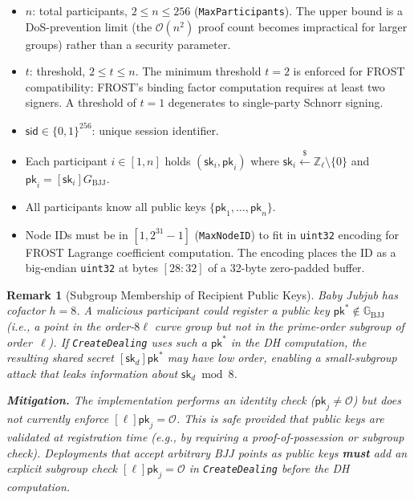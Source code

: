 \documentclass[11pt,a4paper]{article}
\newtheorem{remark}{Remark}[section]
\newcommand{\Z}{\mathbb{Z}}
\newcommand{\G}{\mathbb{G}}
\newcommand{\Gbj}{\G_{\mathrm{BJJ}}}
\newcommand{\Fl}{\Z_\ell}
\newcommand{\cofactor}{h}
\newcommand{\genbjj}{G_{\mathrm{BJJ}}}
\newcommand{\sk}{\mathsf{sk}}
\newcommand{\pk}{\mathsf{pk}}
\newcommand{\sid}{\mathsf{sid}}
\newcommand{\getsr}{\xleftarrow{\$}}
\begin{document}
\begin{itemize}[nosep]
  \item $n$: total participants, $2 \le n \le 256$ (\texttt{MaxParticipants}).
    The upper bound is a DoS-prevention limit (the $\mathcal{O}(n^2)$ proof
    count becomes impractical for larger groups) rather than a security
    parameter.
  \item $t$: threshold, $2 \le t \le n$. The minimum threshold $t = 2$ is
    enforced for FROST compatibility: FROST's binding factor computation
    requires at least two signers. A threshold of $t = 1$ degenerates to
    single-party Schnorr signing.
  \item $\sid \in \{0,1\}^{256}$: unique session identifier.
  \item Each participant $i \in [1, n]$ holds $(\sk_i, \pk_i)$ where
    $\sk_i \getsr \Fl \setminus \{0\}$ and $\pk_i = [\sk_i]\genbjj$.
  \item All participants know all public keys $\{\pk_1, \ldots, \pk_n\}$.
  \item Node IDs must be in $[1, 2^{31} - 1]$ (\texttt{MaxNodeID}) to fit in
    \texttt{uint32} encoding for FROST Lagrange coefficient computation. The
    encoding places the ID as a big-endian \texttt{uint32} at bytes $[28{:}32]$
    of a 32-byte zero-padded buffer.
\end{itemize}

\begin{remark}[Subgroup Membership of Recipient Public Keys]
  \label{rem:subgroup-check}
  Baby Jubjub has cofactor $\cofactor = 8$. A malicious participant could
  register a public key $\pk^* \notin \Gbj$ (i.e., a point in the order-$8\ell$
  curve group but not in the prime-order subgroup of order~$\ell$). If
  \texttt{CreateDealing} uses such a $\pk^*$ in the DH computation, the
  resulting shared secret $[\sk_d]\pk^*$ may have low order, enabling a
  small-subgroup attack that leaks information about $\sk_d \bmod 8$.

  \medskip\noindent\textbf{Mitigation.}
  The implementation performs an identity check ($\pk_j \ne \mathcal{O}$)
  but does not currently enforce $[\ell]\pk_j = \mathcal{O}$. This is safe
  \emph{provided} that public keys are validated at registration time
  (e.g., by requiring a proof-of-possession or subgroup check). Deployments
  that accept arbitrary BJJ points as public keys \textbf{must} add an
  explicit subgroup check $[\ell]\pk_j = \mathcal{O}$ in
  \texttt{CreateDealing} before the DH computation.
\end{remark}
\end{document}
